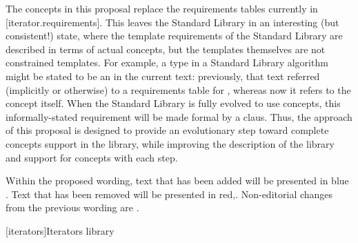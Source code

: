 \documentclass[american,twoside]{book}
\begin{document}
\begin{titlepage}
The concepts in this proposal replace the requirements tables
currently in [iterator.requirements]. This leaves the Standard Library
in an interesting (but consistent!) state, where the template
requirements of the Standard Library are described in terms of actual
concepts, but the templates themselves are not constrained
templates. For example, a type  in a Standard Library
algorithm might be stated to be an  in the
current text: previously, that text referred (implicitly or otherwise)
to a requirements table for , whereas now it
refers to the  concept itself. When the Standard
Library is fully evolved to use concepts, this informally-stated
requirement will be made formal by a  claus. Thus, the
approach of this proposal is designed to provide an evolutionary step
toward complete concepts support in the library, while improving the
description of the library and support for concepts with each step.

Within the proposed wording, text that has been added
\textcolor{addclr}{will be presented in blue} . Text that has been removed will be
presented \textcolor{remclr}{in red},. Non-editorial
changes from the previous wording are . 

\end{titlepage}

\pagestyle{fancy}
\fancyhead[LE,RO]{\textbf{\rightmark}}
\fancyhead[RE]{\textbf{\leftmark\hspace{1em}\thepage}}
\fancyhead[LO]{\textbf{\thepage\hspace{1em}\leftmark}}


\renewcommand{\sectionmark}[1]{\markright{\thesection\hspace{1em}#1}}
\renewcommand{\chaptermark}[1]{\markboth{#1}{}}

\setcounter{chapter}{23}
[iterators]{Iterators library}
\end{document}
